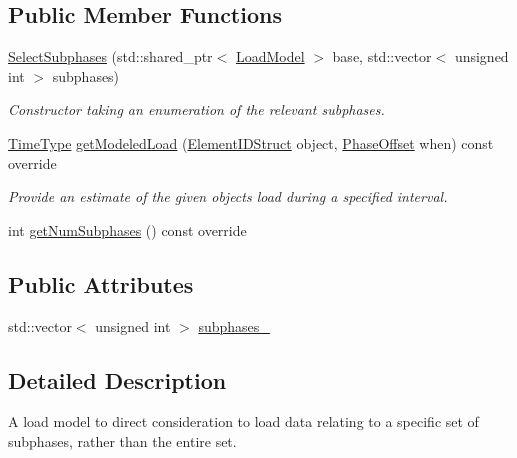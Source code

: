 \subsection*{Public Member Functions}
\begin{DoxyCompactItemize}
\item 
\hyperlink{classvt_1_1vrt_1_1collection_1_1balance_1_1_select_subphases_a6eeee8aa0dce1a0483549835006a0bed}{Select\+Subphases} (std\+::shared\+\_\+ptr$<$ \hyperlink{structvt_1_1vrt_1_1collection_1_1balance_1_1_load_model}{Load\+Model} $>$ base, std\+::vector$<$ unsigned int $>$ subphases)
\begin{DoxyCompactList}\small\item\em Constructor taking an enumeration of the relevant subphases. \end{DoxyCompactList}\item 
\hyperlink{namespacevt_a876a9d0cd5a952859c72de8a46881442}{Time\+Type} \hyperlink{classvt_1_1vrt_1_1collection_1_1balance_1_1_select_subphases_abb8177e14c5bba35b583e40f9ab4e14f}{get\+Modeled\+Load} (\hyperlink{namespacevt_1_1vrt_1_1collection_1_1balance_a9f5b53fafb270212279a4757d2c4cd28}{Element\+I\+D\+Struct} object, \hyperlink{structvt_1_1vrt_1_1collection_1_1balance_1_1_phase_offset}{Phase\+Offset} when) const override
\begin{DoxyCompactList}\small\item\em Provide an estimate of the given object\textquotesingle{}s load during a specified interval. \end{DoxyCompactList}\item 
int \hyperlink{classvt_1_1vrt_1_1collection_1_1balance_1_1_select_subphases_aa92c8fa929624c30a25442391bc3e80d}{get\+Num\+Subphases} () const override
\end{DoxyCompactItemize}
\subsection*{Public Attributes}
\begin{DoxyCompactItemize}
\item 
std\+::vector$<$ unsigned int $>$ \hyperlink{classvt_1_1vrt_1_1collection_1_1balance_1_1_select_subphases_ad9ad62b67851546a4377ee6a4e17181e}{subphases\+\_\+}
\end{DoxyCompactItemize}


\subsection{Detailed Description}
A load model to direct consideration to load data relating to a specific set of subphases, rather than the entire set. 

